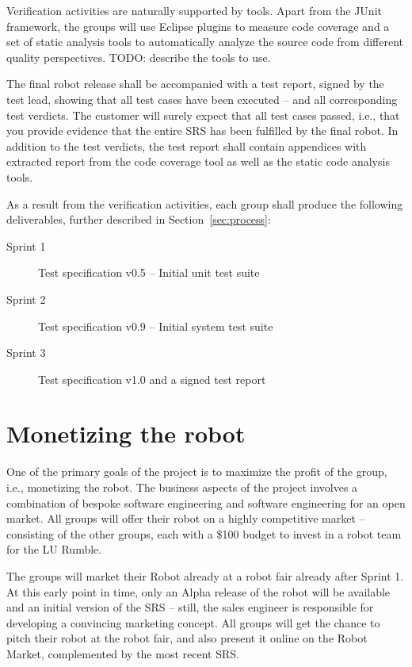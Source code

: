 \documentclass{scrreprt}
\begin{document}
Verification activities are naturally supported by tools. Apart from the JUnit framework, the groups will use Eclipse plugins to measure code coverage and a set of static analysis tools to automatically analyze the source code from different quality perspectives. TODO: describe the tools to use.

The final robot release shall be accompanied with a test report, signed by the test lead, showing that all test cases have been executed -- and all corresponding test verdicts. The customer will surely expect that all test cases passed, i.e., that you provide evidence that the entire SRS has been fulfilled by the final robot. In addition to the test verdicts, the test report shall contain appendices with extracted report from the code coverage tool as well as the static code analysis tools.

As a result from the verification activities, each group shall produce the following deliverables, further described in Section~\ref{sec:process}:
\begin{description}
\item[Sprint 1] Test specification v0.5 -- Initial unit test suite
\item[Sprint 2] Test specification v0.9 -- Initial system test suite
\item[Sprint 3] Test specification v1.0 and a signed test report
\end{description}

\chapter{Monetizing the robot}
One of the primary goals of the project is to maximize the profit of the group, i.e., monetizing the robot. The business aspects of the project involves a combination of bespoke software engineering and software engineering for an open market. All groups will offer their robot on a highly competitive market -- consisting of the other groups, each with a \$100 budget to invest in a robot team for the LU Rumble.

The groups will market their Robot already at a robot fair already after Sprint 1. At this early point in time, only an Alpha release of the robot will be available and an initial version of the SRS -- still, the sales engineer is responsible for developing a convincing marketing concept. All groups will get the chance to pitch their robot at the robot fair, and also present it online on the Robot Market, complemented by the most recent SRS.
\end{document}
